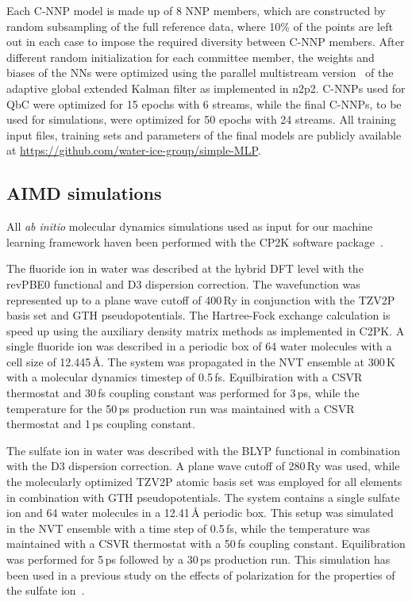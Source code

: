\documentclass[aip,jcp,amsmath,amssymb,floatfix,reprint,citeautoscript,noeprint]{revtex4-1}
\begin{document}
\begin{bibunit}
%
Each C-NNP model is made up of 8 NNP members, which are
constructed by random subsampling of the full reference data,
where 10\% of the points are left out in each case to
impose the required diversity between C-NNP members.
%
After different random initialization for each committee member,
the weights and biases of the NNs were optimized using the
parallel multistream version~\cite{Singraber2019/10.1021/acs.jctc.8b01092}
of the adaptive global extended Kalman filter
as implemented in n2p2.
%
C-NNPs used for QbC were optimized for 15 epochs with 6 streams,
while the final C-NNPs, to be used for simulations,
were optimized for 50 epochs with 24 streams.
%
All training input files, training sets
and parameters of the final models are publicly available
at \url{https://github.com/water-ice-group/simple-MLP}.


%
\subsection*{AIMD simulations}
\label{subsec:aimd}
%

All \textit{ab initio} molecular dynamics simulations used as input for our machine learning
framework haven been performed with the CP2K software package~\cite{Kuhne2020/10.1063/5.0007045}.


%
The fluoride ion in water was described at the
hybrid DFT level with the revPBE0 functional
and D3 dispersion correction.
%
The wavefunction was represented up to a plane wave 
cutoff of 400\,Ry in conjunction with the 
TZV2P basis set and GTH pseudopotentials.
%
The Hartree-Fock exchange calculation is speed up
using the auxiliary density matrix methods as
implemented in C2PK.
%
A single fluoride ion was described in a periodic
box of 64 water molecules with a cell size of 12.445\,\AA{}.
%
The system was propagated in the NVT ensemble at 300\,K
with a molecular dynamics timestep of 0.5\,fs.
%
Equilbiration with a CSVR thermostat and 30\,fs coupling constant
was performed for 3\,ps, while the temperature for the 50\,ps
production run was maintained with a CSVR thermostat and 1\,ps
coupling constant.


%
The sulfate ion in water was described with the
BLYP functional in combination with the D3 dispersion correction.
%
A plane wave cutoff of 280\,Ry was used, while the
molecularly optimized TZV2P atomic basis set was employed for all elements
in combination with GTH pseudopotentials.
%
The system contains a single sulfate ion and 64 water molecules
in a 12.41\,\AA{} periodic box.
%
This setup was simulated in the NVT ensemble with
a time step of 0.5\,fs, while the temperature was
maintained with a CSVR thermostat with a 50\,fs coupling constant.
%
Equilibration was performed for 5\,ps followed by a 30\,ps
production run.
%
This simulation has been used in a previous study
on the effects of polarization for the properties
of the sulfate ion~\cite{Pegado2012/10.1039/c2cp40711f}.



\end{bibunit}
\end{document}
